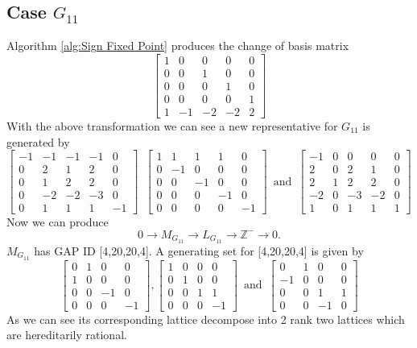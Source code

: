\documentclass{article}
\theoremstyle{plain}
\theoremstyle{definition}
\newcommand{\Z}{\ensuremath{\mathbb{Z}}}
\newcommand{\tand}{\ensuremath{\,\,\, \text{and} \,\,\,}}
\newcommand{\exactseqs}[1]{\ensuremath{0 \longrightarrow M_{#1} \longrightarrow L_{#1} \longrightarrow \Z^{-} \longrightarrow 0}}
\begin{document}
\subsection{Case $G_{11}$}
Algorithm \ref{alg:Sign Fixed Point} produces the change of basis matrix 
$$
 \left[ \begin {array}{ccccc} 1&0&0&0&0\\ 0&0&1&0&0
\\ 0&0&0&1&0\\ 0&0&0&0&1
\\ 1&-1&-2&-2&2\end {array} \right]
$$
With the above transformation we can see a new representative for $G_{11}$ is generated by 
$$
\left[ \begin {array}{cccc|c} -1&-1&-1&-1&0\\ 0&2&1&
2&0\\ 0&1&2&2&0\\ 0&-2&-2&-3&0
\\ \hline 0&1&1&1&-1\end {array} \right] 
\,\,\,
 \left[ \begin {array}{cccc|c} 1&1&1&1&0\\ 0&-1&0&0&0
\\ 0&0&-1&0&0\\ 0&0&0&-1&0
\\ \hline 0&0&0&0&-1\end {array} \right] 
\tand
 \left[ \begin {array}{cccc|c} -1&0&0&0&0\\ 2&0&2&1&0
\\ 2&1&2&2&0\\ -2&0&-3&-2&0
\\ \hline 1&0&1&1&1\end {array} \right] 
$$
 Now we can produce
$$
\exactseqs{G_{11}}
.$$
$M_{G_{11}}$ has GAP ID [4,20,20,4]. A generating set for [4,20,20,4] is given by 
$$
 \left[ \begin {array}{cccc} 0&1&0&0\\ 1&0&0&0
\\ 0&0&-1&0\\ 0&0&0&-1\end {array}
 \right], 
 \left[ \begin {array}{cccc} 1&0&0&0\\ 0&1&0&0
\\ 0&0&1&1\\ 0&0&0&-1\end {array}
 \right] 
 \tand
 \left[ \begin {array}{cccc} 0&1&0&0\\ -1&0&0&0
\\ 0&0&1&1\\ 0&0&-1&0\end {array}
 \right] 
$$
As we can see its corresponding lattice decompose into 2 rank two lattices which are hereditarily rational.
\end{document}

